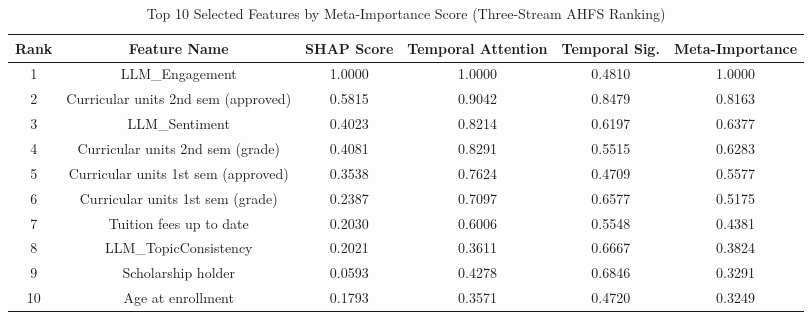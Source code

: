 \begin{table}[t]
\centering
\caption{Top 10 Selected Features by Meta-Importance Score (Three-Stream AHFS Ranking)}
\label{tab:feature_selection}
\small
\begin{tabular}{cccccc}
\toprule
\textbf{Rank} & \textbf{Feature Name} & \textbf{SHAP Score} & \textbf{Temporal Attention} & \textbf{Temporal Sig.} & \textbf{Meta-Importance} \\
\midrule
1 & LLM\_Engagement & 1.0000 & 1.0000 & 0.4810 & 1.0000 \\
2 & Curricular units 2nd sem (approved) & 0.5815 & 0.9042 & 0.8479 & 0.8163 \\
3 & LLM\_Sentiment & 0.4023 & 0.8214 & 0.6197 & 0.6377 \\
4 & Curricular units 2nd sem (grade) & 0.4081 & 0.8291 & 0.5515 & 0.6283 \\
5 & Curricular units 1st sem (approved) & 0.3538 & 0.7624 & 0.4709 & 0.5577 \\
6 & Curricular units 1st sem (grade) & 0.2387 & 0.7097 & 0.6577 & 0.5175 \\
7 & Tuition fees up to date & 0.2030 & 0.6006 & 0.5548 & 0.4381 \\
8 & LLM\_TopicConsistency & 0.2021 & 0.3611 & 0.6667 & 0.3824 \\
9 & Scholarship holder & 0.0593 & 0.4278 & 0.6846 & 0.3291 \\
10 & Age at enrollment & 0.1793 & 0.3571 & 0.4720 & 0.3249 \\
\bottomrule
\end{tabular}
\end{table}